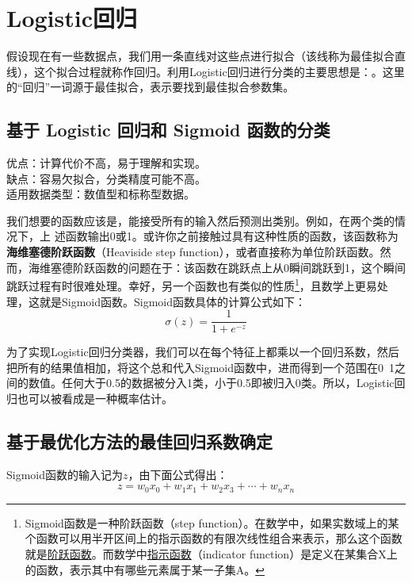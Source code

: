 \chapter{Logistic回归\label{chapter05}}
假设现在有一些数据点，我们用一条直线对这些点进行拟合（该线称为最佳拟合直线），这个拟合过程就称作回归。利用Logistic回归进行分类的主要思想是：。这里的“回归”一词源于最佳拟合，表示要找到最佳拟合参数集。

\section{基于 Logistic 回归和 Sigmoid 函数的分类}
\begin{tcolorbox}[title=Logistic回归]
    优点：计算代价不高，易于理解和实现。\\
    缺点：容易欠拟合，分类精度可能不高。\\
    适用数据类型：数值型和标称型数据。
\end{tcolorbox}

我们想要的函数应该是，能接受所有的输入然后预测出类别。例如，在两个类的情况下，上
述函数输出0或1。或许你之前接触过具有这种性质的函数，该函数称为\textbf{海维塞德阶跃函数}（Heaviside step function），或者直接称为单位阶跃函数。然而，海维塞德阶跃函数的问题在于：该函数在跳跃点上从0瞬间跳跃到1，这个瞬间跳跃过程有时很难处理。幸好，另一个函数也有类似的性质\footnote{Sigmoid函数是一种阶跃函数（step function）。在数学中，如果实数域上的某个函数可以用半开区间上的指示函数的有限次线性组合来表示，那么这个函数就是\href{https://en.wikipedia.org/wiki/Step_function}{阶跃函数}。而数学中\href{https://en.wikipedia.org/wiki/Indicator_function}{指示函数}（indicator function）是定义在某集合X上的函数，表示其中有哪些元素属于某一子集A。}，且数学上更易处理，这就是Sigmoid函数。Sigmoid函数具体的计算公式如下：
\begin{equation*}
    \sigma(z)=\frac{1}{1+e^{-z}}
\end{equation*}

为了实现Logistic回归分类器，我们可以在每个特征上都乘以一个回归系数，然后把所有的结果值相加，将这个总和代入Sigmoid函数中，进而得到一个范围在0~1之间的数值。任何大于0.5的数据被分入1类，小于0.5即被归入0类。所以，Logistic回归也可以被看成是一种概率估计。

\section{基于最优化方法的最佳回归系数确定}
Sigmoid函数的输入记为$z$，由下面公式得出：
\begin{equation*}
    z =w_0x_0+w_1x_1+w_2x_3+\cdots+w_nx_n
\end{equation*}
